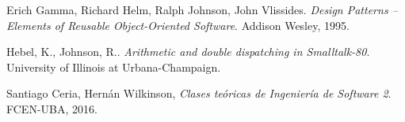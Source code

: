 \begin{thebibliography}{9}

  Erich Gamma, Richard Helm, Ralph Johnson, John Vlissides.
  \emph{Design Patterns – Elements of Reusable Object-Oriented Software}.  
  Addison Wesley, 1995.

    Hebel, K., Johnson, R.. 
    \emph{Arithmetic and double dispatching in Smalltalk-80}.
    University of Illinois at Urbana-Champaign.

    Santiago Ceria, Hernán Wilkinson, 
    \emph{Clases teóricas de Ingeniería de Software 2}.
    FCEN-UBA,
    2016.

\end{thebibliography}